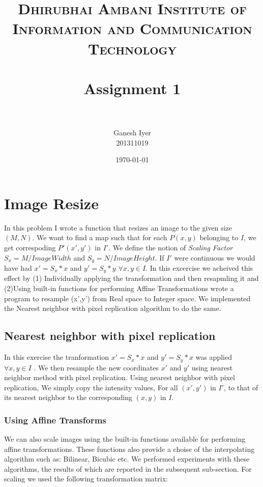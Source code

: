 \documentclass[paper=a4, fontsize=11pt]{scrartcl} %
\title{	
\normalfont \normalsize 
\textsc{Dhirubhai Ambani Institute of Information and Communication Technology} \\ [25pt] %
\horrule{0.5pt} \\[0.4cm] %
\huge Assignment 1 \\ %
\horrule{2pt} \\[0.5cm] %
}
\author{Ganesh Iyer \\ 201311019} %
\date{\normalsize\today} %
\numberwithin{equation}{section} %
\numberwithin{figure}{section} %
\numberwithin{table}{section} %
\begin{document}
\maketitle %


\section{Image Resize}

In this problem I wrote a function that resizes an image to the given size \((M,N)\). We want to find a map such that for each \(P(x,y)\) belonging to \(I\), we get correspoding \(P'(x',y')\) in \(I'\). We define the notion of \textsl{Scaling Factor} \(S_x = M/ImageWidth\) and \(S_y = N/ImageHeight\). If \(I'\) were continuous we would have had \(x' = S_x*x\) and \(y' = S_y*y\) \(\forall x,y \in I\). In this excercise we acheived this effect by (1) Individually applying the transformation and then resapmling it and (2)Using built-in functions for performing Affine Transformations
wrote a program to resample (x',y') from Real space to Integer space. We implemented the Nearest neighbor with pixel replication algorithm to do the same. 


\subsection{Nearest neighbor with pixel replication}

In this exercise the tranformation \(x' = S_x*x\) and \(y' = S_y*x\) was applied \(\forall x,y \in I\) . We then resample the new coordinates \(x'\) and \(y'\) using  nearest neighbor method with pixel replication. 
Using nearest neighbor with pixel replication, We simply copy the intensity values, For all \((x', y')\) in \(I'\), to that of its nearest neighbor to the corresponding \((x,y)\) in \(I\).


\subsubsection{Using Affine Transforms}

We can also scale images using the built-in functions available for performing affine transformations. These functions also provide a choise of the interpolating algorithm such as: Bilinear, Bicubic etc. We performed experiments with these algorithms, the results of which are reported in the subsequent sub-section. For scaling we used the following transformation matrix:
\end{document}
